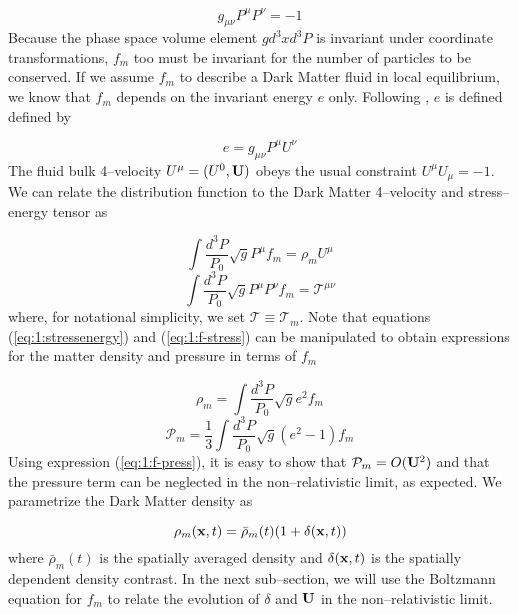 \begin{equation}
\label{eq:1:m-constraint}
g_{\mu\nu}P^\mu P^\nu = -1
\end{equation} 
%
Because the phase space volume element $g d^3x d^3P$ is invariant under coordinate transformations, $f_m$ too must be invariant for the number of particles to be conserved. If we assume $f_m$ to describe a Dark Matter fluid in local equilibrium, we know that $f_m$ depends on the invariant energy $e$ only. Following \citep{JuttnerCov}, $e$ is defined defined by 

\begin{equation}
\label{eq:1:invariant-e}
e = g_{\mu\nu}P^\mu U^\nu
\end{equation}
%
The fluid bulk 4--velocity $U^\mu = (U^0,\mathbf{U})$ obeys the usual constraint $U^\mu U_\mu=-1$. We can relate the distribution function to the Dark Matter 4--velocity and stress--energy tensor \citep{JuttnerCov} as

\begin{equation}
\label{eq:1:f-velocity}
\int \frac{d^3 P}{P_0}\sqrt{g} P^\mu f_m = \rho_m U^\mu 
\end{equation}
%
\begin{equation}
\label{eq:1:f-stress}
\int \frac{d^3 P}{P_0}\sqrt{g} P^\mu P^\nu f_m = \mathcal{T}^{\mu\nu} 
\end{equation}
%
where, for notational simplicity, we set $\mathcal{T}\equiv \mathcal{T}_m$. Note that equations (\ref{eq:1:stressenergy}) and (\ref{eq:1:f-stress}) can be manipulated to obtain expressions for the matter density and pressure in terms of $f_m$

\begin{equation}
\label{eq:1:f-rho}
\rho_m = \int \frac{d^3 P}{P_0}\sqrt{g}e^2 f_m
\end{equation}
%
\begin{equation}
\label{eq:1:f-press}
\mathcal{P}_m = \frac{1}{3}\int \frac{d^3 P}{P_0}\sqrt{g}(e^2-1) f_m
\end{equation}
%
Using expression (\ref{eq:1:f-press}), it is easy to show that $\mathcal{P}_m = O(\mathbf{U}^2)$ and that the pressure term can be neglected in the non--relativistic limit, as expected. 
We parametrize the Dark Matter density as 

\begin{equation}
\label{eq:1:matter-rho}
\rho_m(\mathbf{x},t) = \bar{\rho}_m(t)(1+\delta(\mathbf{x},t))
\end{equation}
%
where $\bar{\rho}_m(t)$ is the spatially averaged density and $\delta(\mathbf{x},t)$ is the spatially dependent density contrast. In the next sub--section, we will use the Boltzmann equation for $f_m$ to relate the evolution of $\delta$ and $\mathbf{U}$ in the non--relativistic limit.      

